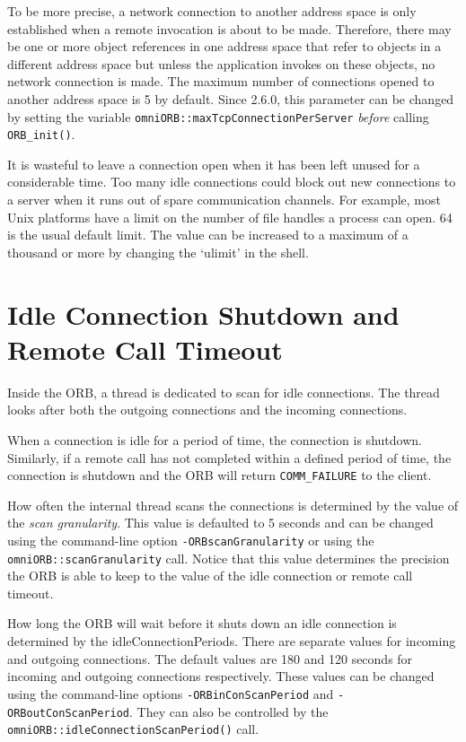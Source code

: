 \documentclass[11pt,twoside,a4paper]{book}
\newcommand{\code}[1]{\texttt{#1}}
\newcommand{\op}[1]{\texttt{#1()}}
\newcommand{\dsc}{\discretionary{}{}{}}
\begin{document}
To be more precise, a network connection to another address space is
only established when a remote invocation is about to be made.
Therefore, there may be one or more object references in one address
space that refer to objects in a different address space but unless
the application invokes on these objects, no network connection is
made. The maximum number of connections opened to another address
space is 5 by default. Since 2.6.0, this parameter can be changed by
setting the variable \code{omniORB::maxTcpConnectionPerServer}
\emph{before} calling \op{ORB\_init}.

It is wasteful to leave a connection open when it has been left unused
for a considerable time. Too many idle connections could block out new
connections to a server when it runs out of spare communication
channels. For example, most Unix platforms have a limit on the number
of file handles a process can open. 64 is the usual default limit. The
value can be increased to a maximum of a thousand or more by changing
the `ulimit' in the shell.

\section{Idle Connection Shutdown and Remote Call Timeout}
\label{sec_shut}

Inside the ORB, a thread is dedicated to scan for idle connections.
The thread looks after both the outgoing connections and the incoming
connections.

When a connection is idle for a period of time, the connection is
shutdown. Similarly, if a remote call has not completed within a
defined period of time, the connection is shutdown and the ORB will
return \code{COMM\_FAILURE} to the client.

How often the internal thread scans the connections is determined by
the value of the \emph{scan granularity}. This value is defaulted to 5
seconds and can be changed using the command-line option
\texttt{-ORBscanGranularity} or using the
\code{omniORB::\dsc{}scanGranularity} call. Notice that this value
determines the precision the ORB is able to keep to the value of the
idle connection or remote call timeout.

How long the ORB will wait before it shuts down an idle connection is
determined by the idleConnectionPeriods. There are separate values for
incoming and outgoing connections. The default values are 180 and 120
seconds for incoming and outgoing connections respectively. These
values can be changed using the command-line options
\texttt{-ORBinConScanPeriod} and \texttt{-ORBoutConScanPeriod}. They
can also be controlled by the
\op{omniORB::idleConnectionScanPeriod} call.
\end{document}

